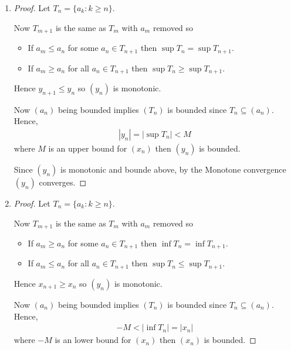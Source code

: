 \begin{enumerate}[label=(\alph*)]
    \item 
    \begin{proof}
        Let $T_n = \{ a_k : k \geq n \}$.

        Now $T_{m+1}$ is the same as $T_m$ with $a_m$ removed so 
        \begin{itemize}
            \item If $a_m \leq a_n $ for some $a_n \in T_{n+1}$ then 
            $\sup T_n = \sup T_{n+1}$.
            
            \item If $a_m \geq a_n $ for all $a_n \in T_{n+1}$ then 
            $\sup T_n \geq \sup T_{n+1}$.
        \end{itemize}
        Hence $y_{n+1} \leq y_n$ so $(y_n)$ is monotonic.

        Now $(a_n)$ being bounded implies $(T_n)$ is bounded since
        $T_n \subseteq (a_n)$. Hence, 
        \begin{align*}
            |y_n| = |\sup T_n| < M
        \end{align*}
        where $M$ is an upper bound for $(x_n)$ then $(y_n)$ is bounded.

        Since $(y_n)$ is monotonic and bounde above, by the
         Monotone convergence \Thm
         $(y_n)$ converges.
    \end{proof}

    \item 
    \begin{proof}
        Let $T_n = \{ a_k : k \geq n \}$.

        Now $T_{m+1}$ is the same as $T_m$ with $a_m$ removed so 
        \begin{itemize}
            \item If $a_m \geq a_n $ for some $a_n \in T_{n+1}$ then 
            $\inf T_n = \inf T_{n+1}$.
            
            \item If $a_m \leq a_n $ for all $a_n \in T_{n+1}$ then 
            $\sup T_n \leq \sup T_{n+1}$.
        \end{itemize}
        Hence $x_{n+1} \geq x_n$ so $(y_n)$ is monotonic.

        Now $(a_n)$ being bounded implies $(T_n)$ is bounded since
        $T_n \subseteq (a_n)$. Hence, 
        \begin{align*}
            -M < |\inf T_n| = |x_n|
        \end{align*}
        where $-M$ is an lower bound for $(x_n)$ then $(x_n)$ is bounded.


\end{proof}
\end{enumerate}
